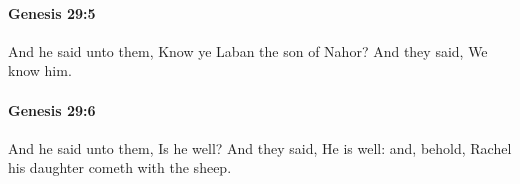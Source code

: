 		\paragraph{Genesis 29:5} %
			\label{GENESIS-29-5}

			And he said unto them, Know ye Laban the son of Nahor? And they said, We know him.


		\paragraph{Genesis 29:6} %
			\label{GENESIS-29-6}

			And he said unto them, Is he well? And they said, He is well: and, behold, Rachel his daughter cometh with the sheep.


